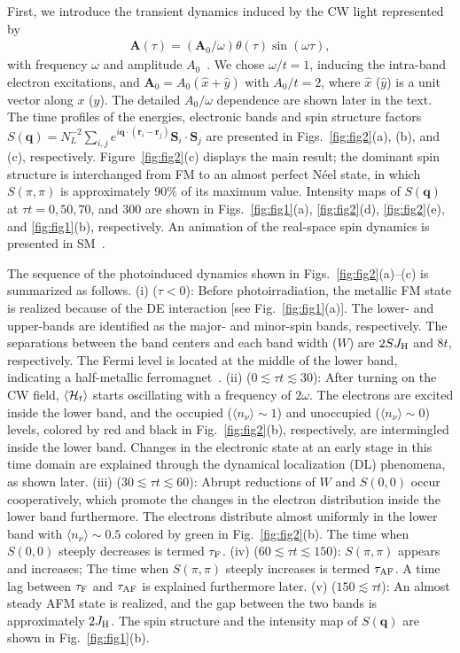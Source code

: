 \documentclass[aps,twocolumn,showpacs,prl,amsmath,amssymb]{revtex4-1}
\begin{document}
First, we introduce the transient dynamics induced by the CW light represented by 
\begin{align}
\bm{A}(\tau)=(\bm{A}_0/\omega) \theta(\tau) \sin(\omega \tau) ,
\label{eq:cw} 
\end{align}
with frequency $\omega$ and amplitude $A_0$~\cite{ampli}. 
We chose $\omega/t=1$, inducing the intra-band electron excitations, and $\bm{A}_0=A_0(\hat x+\hat y)$ with $A_0/t=2$, where $\hat x$ ($\hat y$) is a unit vector along $x$ ($y$). 
The detailed $A_0/\omega$ dependence are shown later in the text. 
The time profiles of the energies, electronic bands and spin structure factors $S(\bm{q})=N_L^{-2}\sum_{i,j} e^{i\bm{q}\cdot (\bm{r}_i-\bm{r}_j)}\bm{S}_i \cdot \bm{S}_j$ are presented in Figs.~\ref{fig:fig2}(a), (b), and (c), respectively. 
Figure~\ref{fig:fig2}(c) displays the main result; the dominant spin structure is interchanged from FM to an almost perfect N\'eel state, in which $S(\pi, \pi)$ is approximately 90$\%$ of its maximum value. 
Intensity maps of $S(\bm{q})$ at $\tau t=0, 50, 70$, and 300 are shown in Figs.~\ref{fig:fig1}(a), 
\ref{fig:fig2}(d), \ref{fig:fig2}(e), and \ref{fig:fig1}(b), respectively. 
An animation of the real-space spin dynamics is presented in SM~\cite{sm}. 

The sequence of the photoinduced dynamics shown in Figs.~\ref{fig:fig2}(a)--(c) is summarized as follows. 
(i) ($\tau < 0$): Before photoirradiation, the metallic FM state is realized because of the DE interaction [see Fig.~\ref{fig:fig1}(a)]. 
The lower- and upper-bands are identified as the major- and minor-spin bands, respectively. 
The separations between the band centers and each band width ($W$) are $2SJ_{\rm H}$ and $8t$, respectively. 
The Fermi level is located at the middle of the lower band, indicating a half-metallic ferromagnet~\cite{park}. 
(ii) ($0 \lesssim \tau t \lesssim 30$): 
After turning on the CW field, $\langle {\cal H}_{t} \rangle$ starts oscillating with a frequency of $2\omega$. 
The electrons are excited inside the lower band, and the occupied ($\langle n_\nu \rangle \sim 1$) and unoccupied ($\langle n_\nu \rangle \sim 0$) levels, colored by red and black in Fig.~\ref{fig:fig2}(b), respectively, are intermingled inside the lower band. 
Changes in the electronic state at an early stage in this time domain are explained through the dynamical localization (DL) phenomena, as shown later. 
(iii) ($30 \lesssim \tau t \lesssim 60$): 
Abrupt reductions of $W$ and $S(0, 0)$ occur cooperatively, which 
promote the changes in the electron distribution inside the lower band furthermore. 
The electrons distribute almost uniformly in the lower band with $\langle n_\nu \rangle \sim 0.5$ colored by green in Fig.~\ref{fig:fig2}(b). 
The time when $S(0, 0)$ steeply decreases is termed $\tau_{\rm F}$. 
(iv) ($60 \lesssim \tau t \lesssim 150$): 
$S(\pi, \pi)$ appears and increases;
The time when $S(\pi, \pi)$ steeply increases is termed $\tau_{\rm AF}$. 
A time lag between $\tau_{\rm F}$ and $\tau_{\rm AF}$ is explained furthermore later. 
(v) ($150 \lesssim \tau t $): 
An almost steady AFM state is realized, and the gap between the two bands is approximately $2J_{\rm H}$. 
The spin structure and the intensity map of $S(\bm{q})$ are shown in Fig.~\ref{fig:fig1}(b). 
\end{document}
